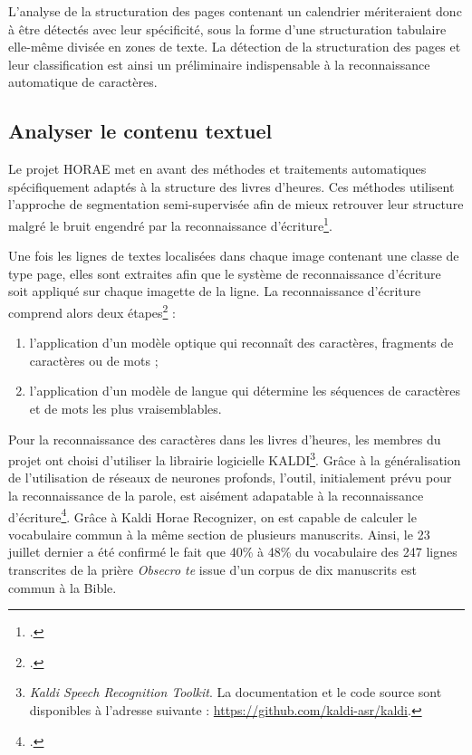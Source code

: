 \documentclass[a4paper,12pt,twoside]{book}
\begin{document}
    L'analyse de la structuration des pages contenant un calendrier mériteraient donc à être détectés avec leur spécificité, sous la forme d'une structuration tabulaire elle-même divisée en zones de texte. La détection de la structuration des pages et leur classification est ainsi un préliminaire indispensable à la reconnaissance automatique de caractères. 

	
	\subsection{Analyser le contenu textuel}
	
	Le projet HORAE met en avant des méthodes et traitements automatiques spécifiquement adaptés à la structure des livres d'heures. Ces méthodes utilisent l'approche de segmentation semi-supervisée afin de mieux retrouver leur structure malgré le bruit engendré par la reconnaissance d'écriture\footcite[p. 13]{Seg_Livres_Heures}. 
	
	Une fois les lignes de textes localisées dans chaque image contenant une classe de type \og page\fg{}, elles sont extraites afin que le système de reconnaissance d'écriture soit appliqué sur chaque imagette de la ligne. La reconnaissance d'écriture comprend alors deux étapes\footcite[p. 22]{Seg_Livres_Heures} : 
	\begin{enumerate}
	    \item l'application d'un modèle optique qui reconnaît des caractères, fragments de caractères ou de mots ;
	    \item l'application d'un modèle de langue qui détermine les séquences de caractères et de mots les plus vraisemblables.
	\end{enumerate}
	
	Pour la reconnaissance des caractères dans les livres d'heures, les membres du projet ont choisi d'utiliser la librairie logicielle KALDI\footnote{\textit{Kaldi Speech Recognition Toolkit}. La documentation et le code source sont disponibles à l'adresse suivante : \url{https://github.com/kaldi-asr/kaldi}.}. Grâce à la généralisation de l'utilisation de réseaux de neurones profonds, l'outil, initialement prévu pour la reconnaissance de la parole, est aisément adapatable à la reconnaissance d'écriture\footcite[p. 23]{Seg_Livres_Heures}. Grâce à Kaldi Horae Recognizer, on est capable de calculer le vocabulaire commun à la même section de plusieurs manuscrits. Ainsi, le 23 juillet dernier a été confirmé le fait que 40\% à 48\% du vocabulaire des 247 lignes transcrites de la prière \textit{Obsecro te} issue d'un corpus de dix manuscrits est commun à la Bible. \\
	
\end{document}
